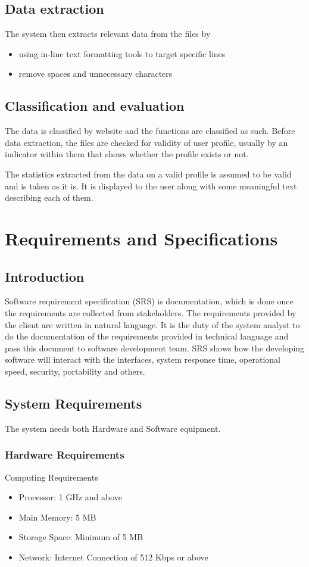 \documentclass[12pt,a4paper]{report}
\begin{document}
\section{Data extraction}
The system then extracts relevant data from the files by
\begin{itemize}[itemsep=0em]
	\item using in-line text formatting tools to target specific lines
	\item remove spaces and unnecessary characters
\end{itemize}
\section{Classification and evaluation}
The data is classified by website and the functions are classified as such. Before data extraction, the files are checked for validity of user profile, usually by an indicator within them that shows whether the profile exists or not.

The statistics extracted from the data on a valid profile is assumed to be valid and is taken as it is. It is displayed to the user along with some meaningful text describing each of them.

\newpage
\chapter{Requirements and Specifications}

\section{Introduction}
Software requirement specification (SRS) is documentation, which is done once the requirements are collected from stakeholders. The requirements provided by the client are written in natural language. It is the duty of the system analyst to do the documentation of the requirements provided in technical language and pass this document to software development team. SRS shows how the developing software will interact with the interfaces, system response time, operational speed, security, portability and others.

\section{System Requirements}
The system needs both Hardware and Software equipment.

\subsection{Hardware Requirements}
Computing Requirements
\begin{itemize}[itemsep=0em]
	\item Processor: 1 GHz and above
	\item Main Memory: 5 MB
	\item Storage Space: Minimum of 5 MB
	\item Network: Internet Connection of 512 Kbps or above
\end{itemize}
\end{document}
